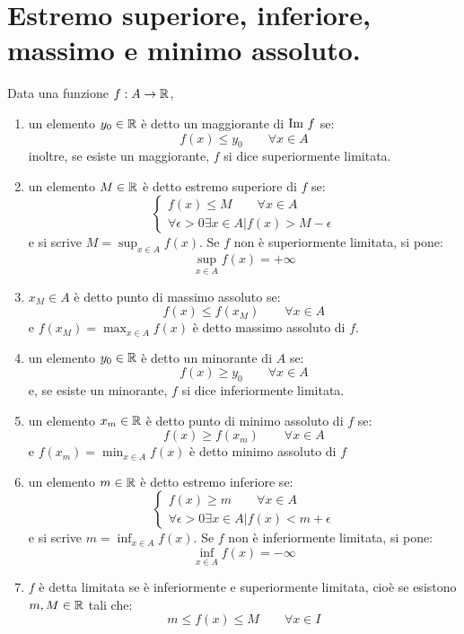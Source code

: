 \section{Estremo superiore, inferiore, massimo e minimo assoluto.}
Data una funzione $f:A\rightarrow\mathbb{R}$,
\begin{enumerate}
\item un elemento $y_0\in\mathbb{R}$ è detto un maggiorante di $\text{Im } f$ se:
\[f(x)\leq y_0 \qquad \forall x\in A\]
inoltre, se esiste un maggiorante, $f$ si dice superiormente limitata.

\item un elemento $M\in\mathbb{R}$ è detto estremo superiore di $f$ se:
\begin{equation*}\begin{cases}
f(x)\leq M \qquad \forall x\in A \\
\forall\epsilon>0 \exists x\in A | f(x)>M-\epsilon
\end{cases}\end{equation*}
e si scrive $M=\sup_{x\in A}{f(x)}$.
Se $f$ non è superiormente limitata, si pone:
\[\sup_{x\in A}{f(x)}=+\infty\]

\item $x_M \in A$ è detto punto di massimo assoluto se:
\[f(x)\leq f(x_M) \qquad \forall x\in A\]
e $f(x_M)=\max_{x\in A}{f(x)}$ è detto massimo assoluto di $f$.

\item un elemento $y_0 \in\mathbb{R}$ è detto un minorante di $A$ se:
\[f(x)\geq y_0 \qquad \forall x\in A\]
e, se esiste un minorante, $f$ si dice inferiormente limitata.

\item un elemento $x_m\in\mathbb{R}$ è detto punto di minimo assoluto di $f$ se:
\[f(x)\geq f(x_m) \qquad \forall x\in A\]
e $f(x_m)=\min_{x\in A}{f(x)}$ è detto minimo assoluto di $f$

\item un elemento $m\in\mathbb{R}$ è detto estremo inferiore se:
\begin{equation*}\begin{cases}
f(x)\geq m \qquad \forall x\in A \\
\forall \epsilon>0\exists x\in A | f(x)<m+\epsilon
\end{cases}\end{equation*}
e si scrive $m=\inf_{x\in A}{f(x)}$.
Se $f$ non è inferiormente limitata, si pone:
\[\inf_{x\in A}{f(x)}=-\infty\]

\item $f$ è detta limitata se è inferiormente e superiormente limitata, cioè se esistono $m,M\in\mathbb{R}$ tali che:
\[m\leq f(x) \leq M \qquad \forall x\in I\]
\end{enumerate}

